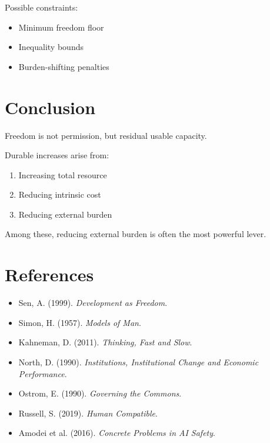 \documentclass[11pt]{article}
\begin{document}
Possible constraints:
\begin{itemize}
\item Minimum freedom floor
\item Inequality bounds
\item Burden-shifting penalties
\end{itemize}

\section{Conclusion}

Freedom is not permission, but residual usable capacity.

Durable increases arise from:
\begin{enumerate}
\item Increasing total resource
\item Reducing intrinsic cost
\item Reducing external burden
\end{enumerate}

Among these, reducing external burden is often the most powerful lever.

\section*{References}

\begin{itemize}
\item Sen, A. (1999). \textit{Development as Freedom}.
\item Simon, H. (1957). \textit{Models of Man}.
\item Kahneman, D. (2011). \textit{Thinking, Fast and Slow}.
\item North, D. (1990). \textit{Institutions, Institutional Change and Economic Performance}.
\item Ostrom, E. (1990). \textit{Governing the Commons}.
\item Russell, S. (2019). \textit{Human Compatible}.
\item Amodei et al. (2016). \textit{Concrete Problems in AI Safety}.
\end{itemize}
\end{document}
